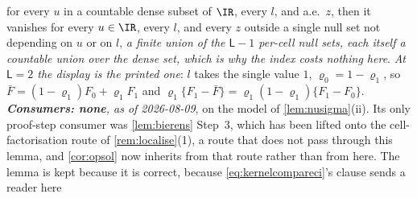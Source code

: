 \begin{lemma}
for every $u$ in a countable dense subset of $\IR$, every $l$, and a.e.\ $z$, then it vanishes for every
$u\in\IR$, every $l$, and every $z$ outside a single null set not depending on $u$ or on $l$, 
\emph{a finite union of the $\mathsf L-1$ per-cell null sets, each itself a countable union over the
dense set, which is why the index costs nothing here}.
\emph{At $\mathsf L=2$ the display is the printed one}: $l$ takes the single value $1$, $\varrho_0=1-\varrho_1$,
so $\bar F=(1-\varrho_1)F_0+\varrho_1F_1$ and
$\varrho_1\{F_1-\bar F\}=\varrho_1(1-\varrho_1)\{F_1-F_0\}$.
\emph{\textbf{Consumers: none}, as of 2026-08-09}, on the model of
\cref{lem:nusigma}\textup{(ii)}. Its only proof-step consumer was \cref{lem:bierens} Step~3, which has
been lifted onto the cell-factorisation route of \cref{rem:localise}\textup{(1)}, a route that does
not pass through this lemma, and \cref{cor:opsol} now inherits from that route rather than from here.
The lemma is kept because it is correct, because \eqref{eq:kernelcompareci}'s clause sends a reader here

\end{lemma}
